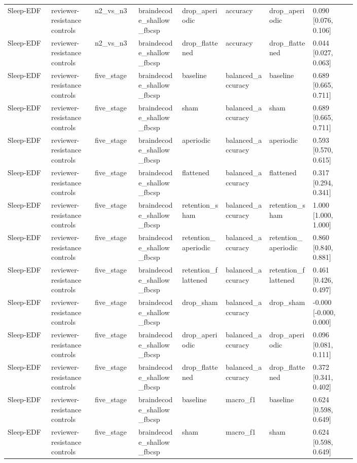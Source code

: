 \begin{longtable}{p{0.10\linewidth}p{0.10\linewidth}p{0.10\linewidth}p{0.10\linewidth}p{0.10\linewidth}p{0.10\linewidth}p{0.10\linewidth}p{0.10\linewidth}}
Sleep-EDF & reviewer-resistance controls & n2\_vs\_n3 & braindecode\_shallow\_fbcsp & drop\_aperiodic & accuracy & drop\_aperiodic & 0.090 [0.076, 0.106]\\
Sleep-EDF & reviewer-resistance controls & n2\_vs\_n3 & braindecode\_shallow\_fbcsp & drop\_flattened & accuracy & drop\_flattened & 0.044 [0.027, 0.063]\\
Sleep-EDF & reviewer-resistance controls & five\_stage & braindecode\_shallow\_fbcsp & baseline & balanced\_accuracy & baseline & 0.689 [0.665, 0.711]\\
Sleep-EDF & reviewer-resistance controls & five\_stage & braindecode\_shallow\_fbcsp & sham & balanced\_accuracy & sham & 0.689 [0.665, 0.711]\\
Sleep-EDF & reviewer-resistance controls & five\_stage & braindecode\_shallow\_fbcsp & aperiodic & balanced\_accuracy & aperiodic & 0.593 [0.570, 0.615]\\
Sleep-EDF & reviewer-resistance controls & five\_stage & braindecode\_shallow\_fbcsp & flattened & balanced\_accuracy & flattened & 0.317 [0.294, 0.341]\\
Sleep-EDF & reviewer-resistance controls & five\_stage & braindecode\_shallow\_fbcsp & retention\_sham & balanced\_accuracy & retention\_sham & 1.000 [1.000, 1.000]\\
Sleep-EDF & reviewer-resistance controls & five\_stage & braindecode\_shallow\_fbcsp & retention\_aperiodic & balanced\_accuracy & retention\_aperiodic & 0.860 [0.840, 0.881]\\
Sleep-EDF & reviewer-resistance controls & five\_stage & braindecode\_shallow\_fbcsp & retention\_flattened & balanced\_accuracy & retention\_flattened & 0.461 [0.426, 0.497]\\
Sleep-EDF & reviewer-resistance controls & five\_stage & braindecode\_shallow\_fbcsp & drop\_sham & balanced\_accuracy & drop\_sham & -0.000 [-0.000, 0.000]\\
Sleep-EDF & reviewer-resistance controls & five\_stage & braindecode\_shallow\_fbcsp & drop\_aperiodic & balanced\_accuracy & drop\_aperiodic & 0.096 [0.081, 0.111]\\
Sleep-EDF & reviewer-resistance controls & five\_stage & braindecode\_shallow\_fbcsp & drop\_flattened & balanced\_accuracy & drop\_flattened & 0.372 [0.341, 0.402]\\
Sleep-EDF & reviewer-resistance controls & five\_stage & braindecode\_shallow\_fbcsp & baseline & macro\_f1 & baseline & 0.624 [0.598, 0.649]\\
Sleep-EDF & reviewer-resistance controls & five\_stage & braindecode\_shallow\_fbcsp & sham & macro\_f1 & sham & 0.624 [0.598, 0.649]\\

\end{longtable}

